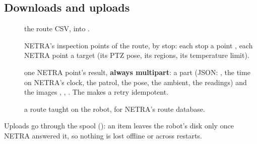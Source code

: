 \subsection{Downloads and uploads}

\begin{description}
  \item[] the route CSV, into .
  \item[] NETRA's inspection points of the route, by
    stop: each stop a point , each NETRA point a target  (its
    PTZ pose, its regions, its temperature limit).
  \item[] one NETRA point's result, \textbf{always multipart}:
    a  part (JSON:  , the time on NETRA's
    clock, the patrol, the pose, the ambient, the readings) and the images ,
    , . The  makes a retry idempotent.
  \item[] a route taught on the robot, for NETRA's route
    database.
\end{description}

Uploads go through the spool (): an item leaves the robot's disk only once NETRA
answered it, so nothing is lost offline or across restarts.
